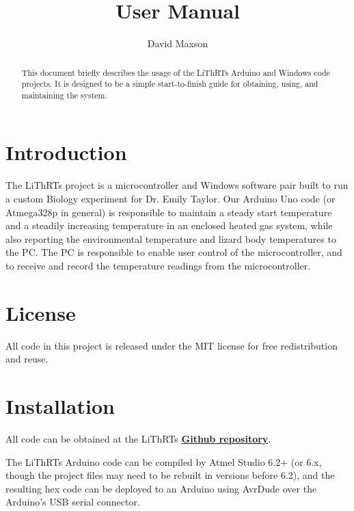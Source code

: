 \documentclass[twoside,a4paper]{refart}
\title{\Lizards User Manual}
\author{David Maxson}
\date{}
\newcommand{\Lizards}[0]{LiThRTs }
\newcommand{\bhyperlink}[2]{\textbf{\href{#1}{#2}}}
\begin{document}
\maketitle

\begin{abstract}
        This document briefly describes the usage of the \Lizards Arduino and Windows code projects. It is designed to be a simple start-to-finish guide for obtaining, using, and maintaining the system.
\end{abstract}

\tableofcontents

\newpage



\section{Introduction}

The \Lizards project is a microcontroller and Windows software pair built to run a custom Biology experiment for Dr. Emily Taylor. Our Arduino Uno code (or Atmega328p in general) is responsible to maintain a steady start temperature and a steadily increasing temperature in an enclosed heated gas system, while also reporting the environmental temperature and lizard body temperatures to the PC. The PC is responsible to enable user control of the microcontroller, and to receive and record the temperature readings from the microcontroller.

\section{License}

All code in this project is released under the MIT license for free redistribution and reuse.

\section{Installation}

All code can be obtained at the \Lizards \bhyperlink{https://github.com/scnerd/Lizards}{Github repository}.

The \Lizards Arduino code can be compiled by Atmel Studio 6.2+ (or 6.x, though the project files may need to be rebuilt in versions before 6.2), and the resulting hex code can be deployed to an Arduino using AvrDude over the Arduino's USB serial connector.
\end{document}
